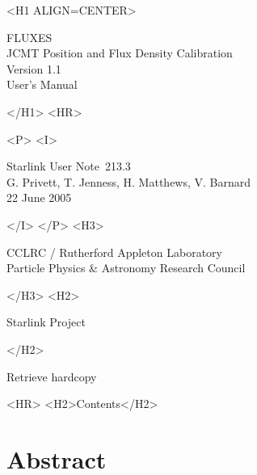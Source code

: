 \documentclass[11pt,twoside]{article}
\newcommand{\stardoccategory}  {Starlink User Note}
\newcommand{\stardocsource}    {sun213.3}
\newcommand{\stardocnumber}    {213.3}
\newcommand{\stardocauthors}   {G. Privett, T. Jenness, H. Matthews, V. Barnard}
\newcommand{\stardocdate}      {22 June 2005}
\newcommand{\stardoctitle}     {FLUXES\\[1ex]
                                JCMT Position and Flux Density Calibration}
\newcommand{\stardocversion}   {Version 1.1}
\newcommand{\stardocmanual}    {User's Manual}
\newcommand{\htmladdnormallink}[2]{#1}
\newcommand{\htmladdimg}[1]{}
\newcommand{\htmlref}[2]{#1}
\newcommand{\htmladdtonavigation}[1]{}
\newcommand{\xlabel}[1]{}
\renewcommand{\_}{\texttt{\symbol{95}}}
\begin{document}
\begin{htmlonly}
   \xlabel{}
   \begin{rawhtml} <H1 ALIGN=CENTER> \end{rawhtml}
      \stardoctitle\\
      \stardocversion\\
      \stardocmanual
   \begin{rawhtml} </H1> <HR> \end{rawhtml}


   \begin{rawhtml} <P> <I> \end{rawhtml}
   \stardoccategory\ \stardocnumber \\
   \stardocauthors \\
   \stardocdate
   \begin{rawhtml} </I> </P> <H3> \end{rawhtml}
      \htmladdnormallink{CCLRC}{http://www.cclrc.ac.uk} /
      \htmladdnormallink{Rutherford Appleton Laboratory}
                        {http://www.cclrc.ac.uk/ral} \\
      \htmladdnormallink{Particle Physics \& Astronomy Research Council}
                        {http://www.pparc.ac.uk} \\
   \begin{rawhtml} </H3> <H2> \end{rawhtml}
      \htmladdnormallink{Starlink Project}{http://www.starlink.ac.uk/}
   \begin{rawhtml} </H2> \end{rawhtml}
   \htmladdnormallink{\htmladdimg{source.gif} Retrieve hardcopy}
      {http://www.starlink.ac.uk/cgi-bin/hcserver?\stardocsource}\\

  \label{stardoccontents}
  \begin{rawhtml}
    <HR>
    <H2>Contents</H2>
  \end{rawhtml}
  \htmladdtonavigation{\htmlref{\htmladdimg{contents_motif.gif}}
        {stardoccontents}}

  \section{\xlabel{abstract}Abstract}
\end{htmlonly}
\end{document}
